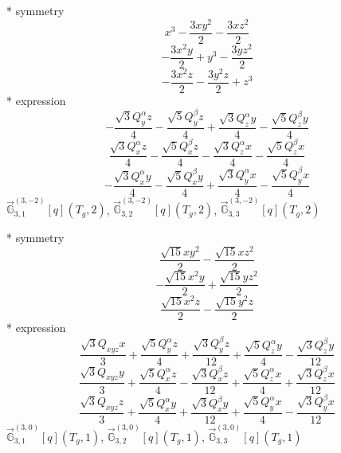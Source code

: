 \documentclass[fleqn,8pt]{jsarticle}
\begin{document}
\noindent\quad ** symmetry
\begin{dmath*}
x^{3} - \frac{3 x y^{2}}{2} - \frac{3 x z^{2}}{2}
\end{dmath*}
\begin{dmath*}
- \frac{3 x^{2} y}{2} + y^{3} - \frac{3 y z^{2}}{2}
\end{dmath*}
\begin{dmath*}
- \frac{3 x^{2} z}{2} - \frac{3 y^{2} z}{2} + z^{3}
\end{dmath*}
\noindent\quad ** expression
\begin{dmath*}
- \frac{\sqrt{3} Q_{y}^{\alpha} z}{4} - \frac{\sqrt{5} Q_{y}^{\beta} z}{4} + \frac{\sqrt{3} Q_{z}^{\alpha} y}{4} - \frac{\sqrt{5} Q_{z}^{\beta} y}{4}
\end{dmath*}
\begin{dmath*}
\frac{\sqrt{3} Q_{x}^{\alpha} z}{4} - \frac{\sqrt{5} Q_{x}^{\beta} z}{4} - \frac{\sqrt{3} Q_{z}^{\alpha} x}{4} - \frac{\sqrt{5} Q_{z}^{\beta} x}{4}
\end{dmath*}
\begin{dmath*}
- \frac{\sqrt{3} Q_{x}^{\alpha} y}{4} - \frac{\sqrt{5} Q_{x}^{\beta} y}{4} + \frac{\sqrt{3} Q_{y}^{\alpha} x}{4} - \frac{\sqrt{5} Q_{y}^{\beta} x}{4}
\end{dmath*}
\noindent\quad $\vec{\mathbb{G}}_{3,1}^{(3,-2)}[q](T_{g},2)$, $\vec{\mathbb{G}}_{3,2}^{(3,-2)}[q](T_{g},2)$, $\vec{\mathbb{G}}_{3,3}^{(3,-2)}[q](T_{g},2)$

\noindent\quad ** symmetry
\begin{dmath*}
\frac{\sqrt{15} x y^{2}}{2} - \frac{\sqrt{15} x z^{2}}{2}
\end{dmath*}
\begin{dmath*}
- \frac{\sqrt{15} x^{2} y}{2} + \frac{\sqrt{15} y z^{2}}{2}
\end{dmath*}
\begin{dmath*}
\frac{\sqrt{15} x^{2} z}{2} - \frac{\sqrt{15} y^{2} z}{2}
\end{dmath*}
\noindent\quad ** expression
\begin{dmath*}
\frac{\sqrt{3} Q_{xyz} x}{3} + \frac{\sqrt{5} Q_{y}^{\alpha} z}{4} + \frac{\sqrt{3} Q_{y}^{\beta} z}{12} + \frac{\sqrt{5} Q_{z}^{\alpha} y}{4} - \frac{\sqrt{3} Q_{z}^{\beta} y}{12}
\end{dmath*}
\begin{dmath*}
\frac{\sqrt{3} Q_{xyz} y}{3} + \frac{\sqrt{5} Q_{x}^{\alpha} z}{4} - \frac{\sqrt{3} Q_{x}^{\beta} z}{12} + \frac{\sqrt{5} Q_{z}^{\alpha} x}{4} + \frac{\sqrt{3} Q_{z}^{\beta} x}{12}
\end{dmath*}
\begin{dmath*}
\frac{\sqrt{3} Q_{xyz} z}{3} + \frac{\sqrt{5} Q_{x}^{\alpha} y}{4} + \frac{\sqrt{3} Q_{x}^{\beta} y}{12} + \frac{\sqrt{5} Q_{y}^{\alpha} x}{4} - \frac{\sqrt{3} Q_{y}^{\beta} x}{12}
\end{dmath*}
\noindent\quad $\vec{\mathbb{G}}_{3,1}^{(3,0)}[q](T_{g},1)$, $\vec{\mathbb{G}}_{3,2}^{(3,0)}[q](T_{g},1)$, $\vec{\mathbb{G}}_{3,3}^{(3,0)}[q](T_{g},1)$
\end{document}
